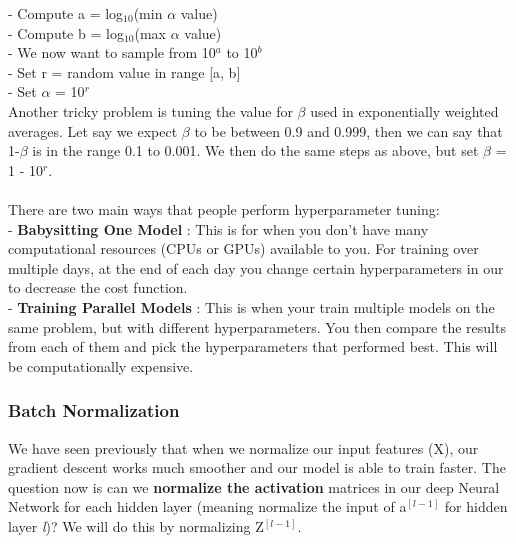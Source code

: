 \documentclass[11pt, a4paper]{article}
\begin{document}
\begin{spacing}{1.1}
	\hspace*{3mm} - Compute a = log$_{10}$(min $\alpha$ value) \\
	\hspace*{3mm} - Compute b = log$_{10}$(max $\alpha$ value)\\
	\hspace*{3mm} - We now want to sample from 10$^a$ to 10$^b$\\
	\hspace*{3mm} - Set r = random value in range [a, b]\\
	\hspace*{3mm} - Set $\alpha$ = 10$^r$ \vspace*{1.5mm} \\
	Another tricky problem is tuning the value for $\beta$ used in exponentially weighted averages. Let say we expect $\beta$ to be between 0.9 and 0.999, then we can say that 1-$\beta$ is in the range 0.1 to 0.001. We then do the same steps as above, but set $\beta$ = 1 - 10$^r$. \\~\\
	There are two main ways that people perform hyperparameter tuning: \vspace*{.5mm} \\
	\hspace*{3mm} - \textbf{Babysitting One Model} : This is for when you don't have many computational resources (CPUs \hspace*{6mm} or GPUs) available to you. For training over multiple days, at the end of each day you change certain \hspace*{6mm} hyperparameters in our to decrease the cost function. \\
	\hspace*{3mm} - \textbf{Training Parallel Models} : This is when your train multiple models on the same problem, but \hspace*{6mm} with different hyperparameters. You then compare the results from each of them and pick the \hspace*{6mm} hyperparameters that performed best. This will be computationally expensive. 
	\subsubsection{Batch Normalization}
	We have seen previously that when we normalize our input features (X), our gradient descent works much smoother and our model is able to train faster. The question now is can we \textbf{normalize the activation} matrices in our deep Neural Network for each hidden layer (meaning normalize the input of a$^{[l-1]}$ for hidden layer \textit{l})? We will do this by normalizing Z$^{[l-1]}$. \newpage


\end{spacing}
\end{document}
